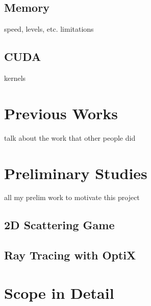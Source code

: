 \subsection{Memory}

speed, levels, etc.  limitations 

\subsection{CUDA}

kernels


\section{Previous Works}

talk about the work that other people did

\section{Preliminary Studies}

all my prelim work to motivate this project

\subsection{2D Scattering Game}


\subsection{Ray Tracing with OptiX}


\section{Scope in Detail}


